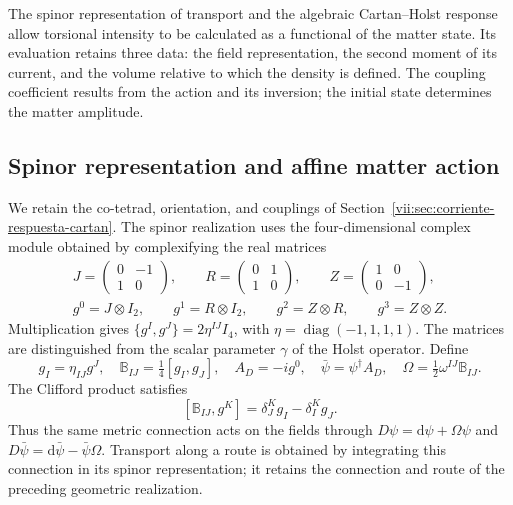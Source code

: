 The spinor representation of transport and the algebraic Cartan--Holst
response allow torsional intensity to be calculated as a functional
of the matter state. Its evaluation retains three data: the field
representation, the second moment of its current, and the volume
relative to which the density is defined. The coupling coefficient
results from the action and its inversion; the initial state
determines the matter amplitude.

\subsection{Spinor representation and affine matter action}
\label{vii:subsec:accion-espinorial-afin}

We retain the co-tetrad, orientation, and couplings of
Section~\ref{vii:sec:corriente-respuesta-cartan}. The spinor
realization uses the four-dimensional complex module obtained by
complexifying the real matrices
\begin{equation}
 \begin{gathered}
 J=\begin{pmatrix}0&-1\\1&0\end{pmatrix},\qquad
 R=\begin{pmatrix}0&1\\1&0\end{pmatrix},\qquad
 Z=\begin{pmatrix}1&0\\0&-1\end{pmatrix},\\
 g^0=J\otimes I_2,\qquad g^1=R\otimes I_2,\qquad
 g^2=Z\otimes R,\qquad g^3=Z\otimes Z.
 \end{gathered}
 \label{vii:eq:clifford-material-explicito}
\end{equation}
Multiplication gives
\(\{g^I,g^J\}=2\eta^{IJ}I_4\), with
\(\eta=\operatorname{diag}(-1,1,1,1)\). The matrices are
distinguished from the scalar parameter \(\gamma\) of the Holst
operator. Define
\begin{equation}
 g_I=\eta_{IJ}g^J,\quad
 \mathbb B_{IJ}=\tfrac14[g_I,g_J],\quad
 A_D=-i g^0,\quad \bar\psi=\psi^\dagger A_D,\quad
 \Omega=\tfrac12\omega^{IJ}\mathbb B_{IJ}.
 \label{vii:eq:adjunto-conexion-espinorial}
\end{equation}
The Clifford product satisfies
\[
 [\mathbb B_{IJ},g^K]=\delta_J^K g_I-\delta_I^K g_J.
\]
Thus the same metric connection acts on the fields through
\(D\psi=\mathrm d\psi+\Omega\psi\) and
\(D\bar\psi=\mathrm d\bar\psi-\bar\psi\Omega\).
Transport along a route is obtained by integrating this connection
in its spinor representation; it retains the connection and route
of the preceding geometric realization.

